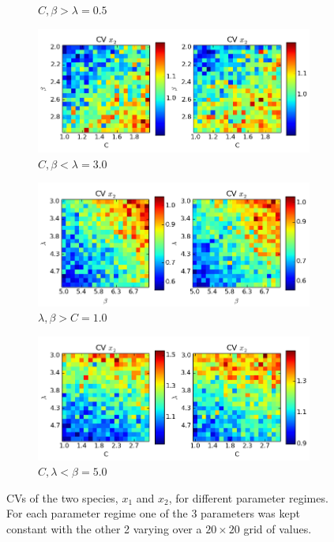 \documentclass[a4paper,12pt]{article}
\begin{document}
\begin{figure}[!ht]
\begin{subfigure}[b]{0.496\textwidth}
                \caption{$C, \beta > \lambda=0.5$}
                \label{fig:vars3}
        \end{subfigure}
        \begin{subfigure}[b]{0.496\textwidth}
                \includegraphics[width=\textwidth]{images/vars4}
                \caption{$C, \beta < \lambda=3.0$}
                \label{fig:vars4}
        \end{subfigure}
          \newline
        \begin{subfigure}[b]{0.496\textwidth}
                \includegraphics[width=\textwidth]{images/vars5}
                \caption{$\lambda, \beta > C=1.0$}
                \label{fig:vars5}
        \end{subfigure}
        \begin{subfigure}[b]{0.496\textwidth}
                \includegraphics[width=\textwidth]{images/vars6}
                \caption{$C, \lambda < \beta=5.0$}
                \label{fig:vars6}
        \end{subfigure}
        
        \caption{CVs of the two species, $x_1$ and $x_2$, for different parameter regimes. For each parameter regime one of the 3 parameters was kept constant with the other 2 varying over a $20 \times 20$ grid of values.}\label{fig:vars}
\end{figure}
\end{document}

